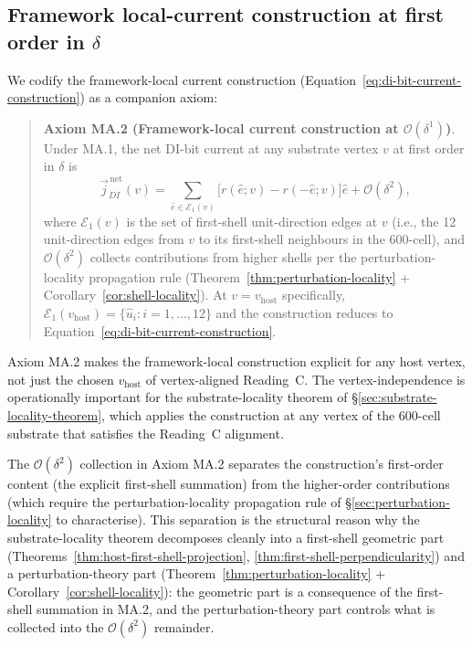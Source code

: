\documentclass[11pt,letterpaper]{article}
\newcommand{\vhost}{v_{\text{host}}}
\newcommand{\jDInet}{\vec{j}_{DI}^{\,\text{net}}}
\newcommand{\bigO}[1]{\mathcal{O}(#1)}
\begin{document}
\subsection{Framework local-current construction at first order in $\delta$}
\label{sec:framework-local-current-axiom}

We codify the framework-local current construction (Equation~\eqref{eq:di-bit-current-construction}) as a companion axiom:

\begin{quote}
\textbf{Axiom MA.2 (Framework-local current construction at $\bigO{\delta^1}$)}. Under MA.1, the net DI-bit current at any substrate vertex $v$ at first order in $\delta$ is
\[
\jDInet(v) = \sum_{\hat{e} \in \mathcal{E}_1(v)} \big[ r(\hat{e}; v) - r(-\hat{e}; v) \big] \hat{e} + \bigO{\delta^2},
\]
where $\mathcal{E}_1(v)$ is the set of first-shell unit-direction edges at $v$ (i.e., the 12 unit-direction edges from $v$ to its first-shell neighbours in the 600-cell), and $\bigO{\delta^2}$ collects contributions from higher shells per the perturbation-locality propagation rule (Theorem~\ref{thm:perturbation-locality} + Corollary~\ref{cor:shell-locality}). At $v = \vhost$ specifically, $\mathcal{E}_1(\vhost) = \{\hat{u}_i : i = 1, \ldots, 12\}$ and the construction reduces to Equation~\eqref{eq:di-bit-current-construction}.
\end{quote}

Axiom MA.2 makes the framework-local construction explicit for any host vertex, not just the chosen $\vhost$ of vertex-aligned Reading~C. The vertex-independence is operationally important for the substrate-locality theorem of \S\ref{sec:substrate-locality-theorem}, which applies the construction at any vertex of the 600-cell substrate that satisfies the Reading~C alignment.

The $\bigO{\delta^2}$ collection in Axiom MA.2 separates the construction's first-order content (the explicit first-shell summation) from the higher-order contributions (which require the perturbation-locality propagation rule of \S\ref{sec:perturbation-locality} to characterise). This separation is the structural reason why the substrate-locality theorem decomposes cleanly into a first-shell geometric part (Theorems~\ref{thm:host-first-shell-projection}, \ref{thm:first-shell-perpendicularity}) and a perturbation-theory part (Theorem~\ref{thm:perturbation-locality} + Corollary~\ref{cor:shell-locality}): the geometric part is a consequence of the first-shell summation in MA.2, and the perturbation-theory part controls what is collected into the $\bigO{\delta^2}$ remainder.
\end{document}
